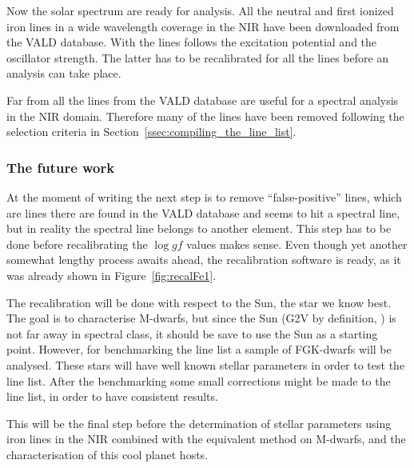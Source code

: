 \documentclass{aa}
\begin{document}
Now the solar spectrum are ready for analysis. All the neutral and first
ionized iron lines in a wide wavelength coverage in the NIR have been
downloaded from the VALD database. With the lines follows the excitation
potential and the oscillator strength. The latter has to be recalibrated for
all the lines before an analysis can take place.

Far from all the lines from the VALD database are useful for a spectral
analysis in the NIR domain. Therefore many of the lines have been removed
following the selection criteria in Section~\ref{ssec:compiling_the_line_list}.

\subsubsection{The future work}
\label{ssub:the_future_work}
At the moment of writing the next step is to remove ``false-positive'' lines,
which are lines there are found in the VALD database and seems to hit a
spectral line, but in reality the spectral line belongs to another element.
This step has to be done before recalibrating the $\log gf$ values makes sense.
Even though yet another somewhat lengthy process awaits ahead, the
recalibration software is ready, as it was already shown in
Figure~\ref{fig:recalFe1}.

The recalibration will be done with respect to the Sun, the star we know best.
The goal is to characterise M-dwarfs, but since the Sun (G2V by definition,
\citet{Gray2006}) is not far away in spectral class, it should be save to use
the Sun as a starting point. However, for benchmarking the line list a sample
of FGK-dwarfs will be analysed. These stars will have well known stellar
parameters in order to test the line list. After the benchmarking some small
corrections might be made to the line list, in order to have consistent
results.

This will be the final step before the determination of stellar parameters
using iron lines in the NIR combined with the equivalent method on M-dwarfs,
and the characterisation of this cool planet hosts.


\newpage


\nocite*{}
\end{document}
